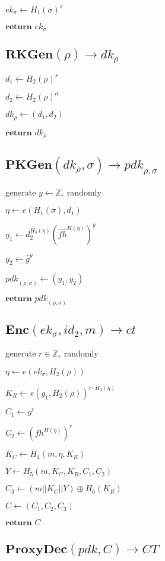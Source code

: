 \documentclass[a4paper]{article}
\begin{document}
$\textit{ek}_\sigma \gets H_1(\sigma)^s$

$\textbf{return }\textit{ek}_\sigma$

\subsection{$\textbf{RKGen}(\rho) \rightarrow \textit{dk}_\rho$}

$d_1 \gets H_2(\rho)^s$

$d_2 \gets H_2(\rho)^\alpha$

$\textit{dk}_\rho \gets (d_1, d_2)$

$\textbf{return }\textit{dk}_\rho$

\subsection{$\textbf{PKGen}(\textit{dk}_\rho, \sigma) \rightarrow \textit{pdk}_{\rho, \sigma}$}

generate $y \gets \mathbb{Z}_r$ randomly

$\eta \gets e(H_1(\sigma), d_1)$

$y_1 \gets d_2^{H_3(\eta)}(\hat{f}\hat{h}^{H(\eta)})^y$

$y_2 \gets \hat{g}^y$

$\textit{pdk}_{(\rho, \sigma)} \gets (y_1, y_2)$

$\textbf{return }\textit{pdk}_{(\rho, \sigma)}$

\subsection{$\textbf{Enc}(\textit{ek}_\sigma, \textit{id}_2, m) \rightarrow \textit{ct}$}

generate $r \in \mathbb{Z}_r$ randomly

$\eta \gets e(\textit{ek}_\sigma, H_2(\rho))$

$K_R \gets e(g_1, H_2(\rho))^{r \cdot H_3(\eta)}$

$C_1 \gets g^r$

$C_2 \gets (fh^{H(\eta)})^r$

$K_C \gets H_4(m, \eta, K_R)$

$Y \gets H_5(m, K_C, K_R, C_1, C_2)$

$C_3 \gets (m || K_C || Y) \oplus H_6(K_R)$

$C \gets (C_1, C_2, C_3)$

$\textbf{return }C$

\subsection{$\textbf{ProxyDec}(\textit{pdk}, C) \rightarrow \textit{CT}$}
\end{document}
